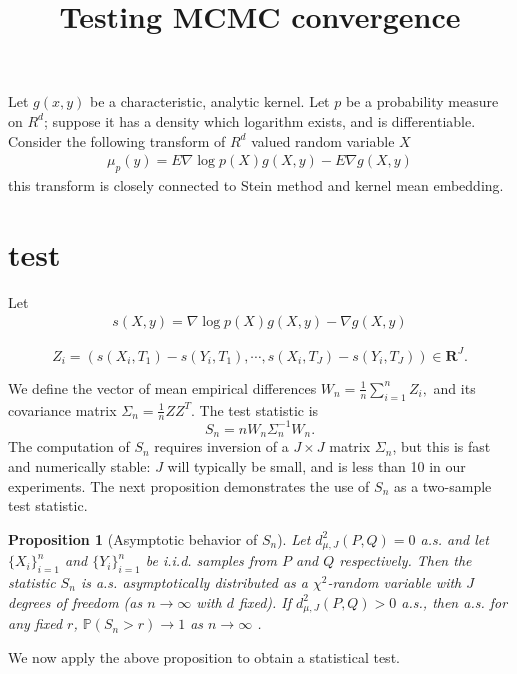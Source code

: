 \documentclass{article}
\title{Testing MCMC convergence}
\author{}
\date{}
\newtheorem{proposition}{Proposition}
\begin{document}
\maketitle

Let $g(x,y)$ be a characteristic, analytic kernel. Let $p$ be a probability measure on $R^d$; suppose it has a density which logarithm exists, and is differentiable. Consider the following transform of $R^d$ valued random variable $X$
\begin{align}
 \mu_p(y) = E  \nabla \log p(X) g(X,y) - E \nabla g(X,y)
\end{align}
this transform is closely connected to Stein method and kernel mean embedding.

\section{test}
Let 
\begin{align}
 s(X,y) = \nabla \log p(X) g(X,y) -  \nabla g(X,y)
\end{align}

\begin{equation}
 Z_i = ( s(X_i,T_1) - s(Y_i,T_1), \cdots, s(X_i,T_J) - s(Y_i,T_J) )\in \mathbf R^J.
\end{equation}

We define the vector of mean empirical differences 
$W_n = \frac 1  n \sum_{i=1}^n Z_i, $
and its covariance matrix
$\Sigma_n = \frac 1  n Z Z^{T}$.
The test statistic is
\begin{equation}
 S_n = n W_n \Sigma_n^{-1} W_n.
\end{equation}
The computation of $S_n$ requires inversion of a $J\times J$ matrix $\Sigma_n$, but this is fast and numerically stable: $J$ will typically be small, and is less than 10 in our experiments. The next proposition demonstrates the use of $S_n$ as a two-sample test statistic.
\begin{proposition}[Asymptotic behavior of $S_n$]
\label{prop:Hotelling}
 Let $d_{\mu,J}^2(P,Q)=0$ a.s. and let $\{X_i\}_{i=1}^n$ and $\{Y_i\}_{i=1}^n$  be i.i.d. samples from $P$ and $Q$ respectively. Then the statistic $S_n$ is a.s. asymptotically distributed as a $\chi^2$-random variable with $J$ degrees of freedom (as $n \to \infty$ with $d$ fixed). If $d_{\mu,J}^2(P,Q)>0$ a.s., then a.s. for any fixed $r$, $\mathbb P(S_n > r) \to 1$  as $n \to \infty$ .
\end{proposition}
We now apply the above proposition to obtain a statistical test. 
\end{document}
